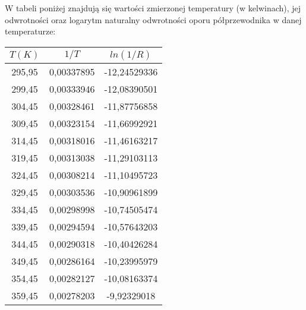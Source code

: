 \documentclass[10pt,a4paper]{article}
\newcommand{\forceindent}{\leavevmode{\parindent=3em\indent}}
\begin{document}
\forceindent W tabeli poniżej znajdują się wartości zmierzonej temperatury (w kelwinach), jej odwrotności oraz logarytm naturalny odwrotności oporu półprzewodnika w danej temperaturze: 

\begin{center}
\begin{tabular}{|c|c|c|}
\multicolumn{1}{c}{$T (K)$} & \multicolumn{1}{c}{$1/T$} & \multicolumn{1}{c}{$ln(1/R)$}\\
\hline
295,95&0,00337895&-12,24529336\\ 
 \hline 
299,45&0,00333946&-12,08390501\\ 
 \hline 
304,45&0,00328461&-11,87756858\\ 
 \hline 
309,45&0,00323154&-11,66992921\\ 
 \hline 
314,45&0,00318016&-11,46163217\\ 
 \hline 
319,45&0,00313038&-11,29103113\\ 
 \hline 
324,45&0,00308214&-11,10495723\\ 
 \hline 
329,45&0,00303536&-10,90961899\\ 
 \hline 
334,45&0,00298998&-10,74505474\\ 
 \hline 
339,45&0,00294594&-10,57643203\\ 
 \hline 
344,45&0,00290318&-10,40426284\\ 
 \hline 
349,45&0,00286164&-10,23995979\\ 
 \hline 
354,45&0,00282127&-10,08163374\\ 
 \hline 
359,45&0,00278203&-9,92329018\\ 
 \hline 

\end{tabular}
\end{center}
\end{document}
